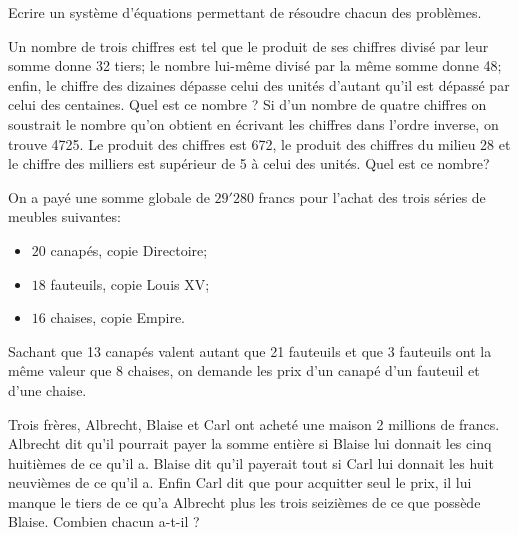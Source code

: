 \documentclass[a4paper,12pt]{report}
\begin{document}
\begin{exo}[2]
Ecrire un système d'équations permettant de résoudre chacun des problèmes.
\begin{tasks}
	\task Un nombre de trois chiffres est tel que le produit de ses chiffres divisé par leur somme donne 32 tiers; le nombre lui-même divisé par la même somme donne 48; enfin, le chiffre des dizaines dépasse celui des unités d'autant qu'il est dépassé par celui des centaines. Quel est ce nombre ?
	\task Si d'un nombre de quatre chiffres on soustrait le nombre qu'on obtient en écrivant les chiffres dans l'ordre inverse, on trouve 4725. Le produit des chiffres est 672, le produit des chiffres du milieu 28 et le chiffre des milliers est supérieur de 5 à celui des unités. Quel est ce nombre?
\end{tasks}
\end{exo}
\begin{exo}[1]
On a payé une somme globale de $29'280$ francs pour l'achat des trois séries de meubles suivantes:
\begin{itemize}
	\item $20$ canapés, copie Directoire;
	\item $18$ fauteuils, copie Louis XV;
	\item $16$ chaises, copie Empire.
\end{itemize}
Sachant que 13 canapés valent autant que 21 fauteuils et que 3 fauteuils ont la même valeur que 8 chaises, on demande les prix d'un canapé d'un fauteuil et d'une chaise.
\end{exo}
\begin{exo}[2]
Trois frères, Albrecht, Blaise et Carl ont acheté une maison 2 millions de francs. Albrecht dit qu'il pourrait payer la somme entière si Blaise lui donnait les cinq huitièmes de ce qu'il a. Blaise dit qu'il payerait tout si Carl lui donnait les huit neuvièmes de ce qu'il a. Enfin Carl dit que pour acquitter seul le prix, il lui manque le tiers de ce qu'a Albrecht plus les trois seizièmes de ce que possède Blaise. Combien chacun a-t-il ?
\end{exo}
\end{document}
